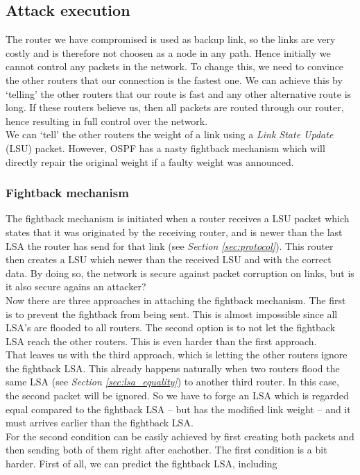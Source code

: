 \documentclass[11pt,a4paper,oneside]{article}
\newcommand{\lsubsection}[2]{\subsection{#1}\label{sec:#2}}
\newcommand{\lsubsubsection}[2]{\subsubsection{#1}\label{sec:#2}}
\begin{document}
    			
    		\lsubsection{Attack execution}{attack_exec}
    			The router we have compromised is used as backup link, so the links are very costly and is therefore not choosen as a node in any path. Hence initially we cannot control any packets in the network. To change this, we need to convince the other routers that our connection is the fastest one. We can achieve this by `telling' the other routers that our route is fast and any other alternative route is long. If these routers believe us, then all packets are routed through our router, hence resulting in full control over the network.\\
    			We can `tell' the other routers the weight of a link using a \textit{Link State Update} (LSU) packet. However, OSPF has a nasty fightback mechanism which will directly repair the original weight if a faulty weight was announced.
    			
    			\lsubsubsection{Fightback mechanism}{fightback}
    				The fightback mechanism is initiated when a router receives a LSU packet which states that it was originated by the receiving router, and is newer than the last LSA the router has send for that link (see \textit{Section \ref{sec:protocol}}). This router then creates a LSU which newer than the received LSU and with the correct data. By doing so, the network is secure against packet corruption on links, but is it also secure agains an attacker?\\
    				Now there are three approaches in attaching the fightback mechanism. The first is to prevent the fightback from being sent. This is almost impossible since all LSA's are flooded to all routers. The second option is to not let the fightback LSA reach the other routers. This is even harder than the first approach.\\
    				That leaves us with the third approach, which is letting the other routers ignore the fightback LSA. This already happens naturally when two routers flood the same LSA (see \textit{Section \ref{sec:lsa_equality}}) to another third router. In this case, the second packet will be ignored. So we have to forge an LSA which is regarded equal compared to the fightback LSA -- but has the modified link weight -- and it must arrives earlier than the fightback LSA.\\
    				For the second condition can be easily achieved by first creating both packets and then sending both of them right after eachother. The first condition is a bit harder. First of all, we can predict the fightback LSA, including 
    			
\end{document}
